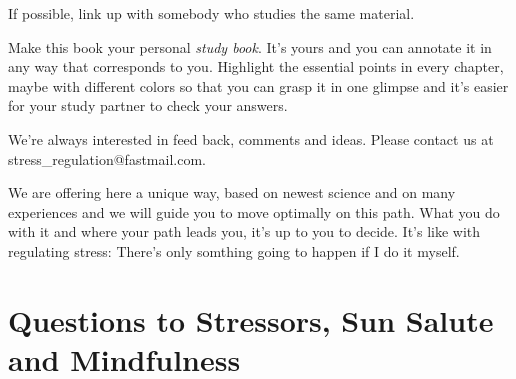\documentclass[../main.tex]{subfiles}
\begin{document}
If possible, link up with somebody who studies the same material.

Make this book your personal \emph{study book}. It's yours and you can annotate it in any way that corresponds to you.
Highlight the essential points in every chapter, maybe with different colors so that you can grasp it in one glimpse and it's easier for your study partner to check your answers.


We're always interested in feed back, comments and ideas. Please contact us at stress\_regulation@fastmail.com.


We are offering here a unique way, based on newest science and on many experiences and we will guide you to move optimally on this path.
What you do with it and where your path leads you, it's up to you to decide.
It's like with regulating stress: There's only somthing going to happen if I do it myself.

\section[Question]{Questions to Stressors, Sun Salute and Mindfulness}
\end{document}
